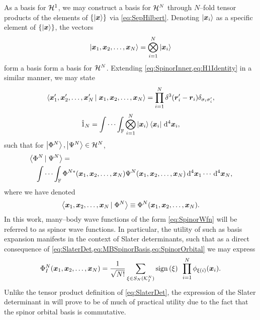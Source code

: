 As a basis for $\mathcal{H}^1$, we may construct a basis for $\mathcal{H}^N$ through $N$--fold tensor products 
of the elements of $\left \lbrace \left\vert \boldsymbol{x} \right\rangle \right\rbrace$ via \cref{eq:SepHilbert}. Denoting $\left\vert \boldsymbol{x}_i \right\rangle$ as
a specific element of $\left \lbrace \left\vert \boldsymbol{x} \right\rangle \right\rbrace$, the vectors
\begin{equation}
  \label{eq:MBSpinorBasis}
  \left\vert \boldsymbol{x}_1,\boldsymbol{x}_2,\ldots,\boldsymbol{x}_N \right\rangle = \bigotimes_{i = 1}^N \left\vert \boldsymbol{x}_i \right\rangle
\end{equation}
form a basis form a basis for $\mathcal{H}^N$. Extending \cref{eq:SpinorInner,eq:H1Identity} in a similar manner, we may state
\begin{equation}
  \left\langle \boldsymbol{x}'_1,\boldsymbol{x}'_2,\ldots,\boldsymbol{x}'_N \left\vert\right. \boldsymbol{x}_1,\boldsymbol{x}_2,\ldots,\boldsymbol{x}_N \right\rangle = \prod_{i=1}^N \delta^3(\boldsymbol{r}'_i - \boldsymbol{r}_i)\delta_{\sigma_i\sigma'_i},
\end{equation}
\begin{equation}
  \hat{1}_N = \idotsint_{\mathbb F} \bigotimes_{i=1}^N \left\vert \boldsymbol{x}_i \right\rangle \left\langle \boldsymbol{x}_i \right\vert \,\mathrm{d}^4\boldsymbol{x}_i,
\end{equation}
such that for $\left\vert \Phi^N \right\rangle,\left\vert \Psi^N \right\rangle \in \mathcal{H}^N$,
\begin{align}
&\left\langle \Phi^N \left\vert\right. \Psi^N \right\rangle = \nonumber \\&\quad \idotsint_{\mathbb F} 
  \Phi^{N*}(\boldsymbol{x}_1,\boldsymbol{x}_2,\ldots,\boldsymbol{x}_N) \Psi^{N}(\boldsymbol{x}_1,\boldsymbol{x}_2,\ldots,\boldsymbol{x}_N) \,\mathrm{d}^4\boldsymbol{x}_1 \cdots \,\mathrm{d}^4\boldsymbol{x}_N,
\end{align}
where we have denoted
\begin{equation}
  \label{eq:SpinorWfn}
  \left\langle \boldsymbol{x}_1,\boldsymbol{x}_2,\ldots,\boldsymbol{x}_N \left\vert\right. \Phi^N \right\rangle \equiv \Phi^N(\boldsymbol{x}_1,\boldsymbol{x}_2,\ldots,\boldsymbol{x}_N).
\end{equation}
In this work, many--body wave functions of the form \cref{eq:SpinorWfn} will be referred to as spinor wave functions.
In particular, the utility of such as basis expansion manifests in the context of Slater determinants, such that as
a direct consequence of \cref{eq:SlaterDet,eq:MBSpinorBasis,eq:SpinorOrbital} we may express
\begin{equation}
  \label{eq:SlaterDetSpace}
  \Phi_I^N(\boldsymbol{x}_1,\boldsymbol{x}_2,\ldots,\boldsymbol{x}_N) = \frac{1}{\sqrt{N!}} \sum_{\xi \in S_N(\mathcal{K}^N_I)} \mathrm{sign}\left( \xi \right) \text{ } 
    \prod_{i = 1 }^N \phi_{\xi(i)}(\boldsymbol{x}_i).
\end{equation}
Unlike the tensor product definition of \cref{eq:SlaterDet}, the expression of the Slater determinant in will prove to be of 
much of practical utility due to the fact that the spinor orbital basis is commutative.

